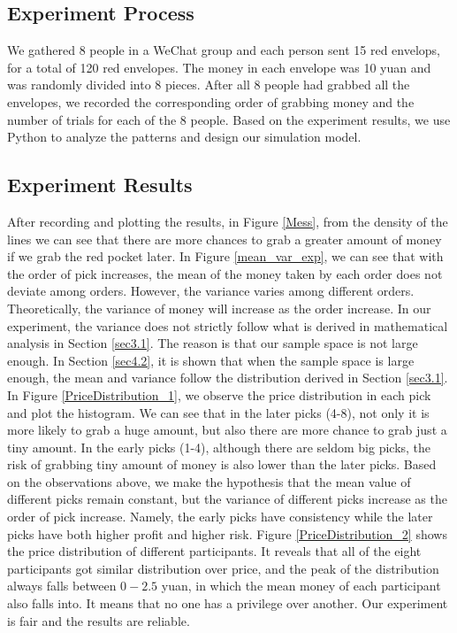 \documentclass{scrartcl}
\begin{document}
\subsection{Experiment Process}
\label{sec2.1}
We gathered 8 people in a WeChat group and each person sent 15 red envelops, for a total of 120 red envelopes. The money in each envelope was 10 yuan and was randomly divided into 8 pieces. After all 8 people had grabbed all the envelopes, we recorded the corresponding order of grabbing money and the number of trials for each of the 8 people. Based on the experiment results, we use Python to analyze the patterns and design our simulation model.

\subsection{Experiment Results}
\label{sec2.2}
After recording and plotting the results, in Figure \ref{Mess}, from the density of the lines we can see that there are more chances to grab a greater amount of money if we grab the red pocket later. In Figure \ref{mean_var_exp}, we can see that with the order of pick increases, the mean of the money taken by each order does not deviate among orders. However, the variance varies among different orders. Theoretically, the variance of money will increase as the order increase. In our experiment, the variance does not strictly follow what is derived in mathematical analysis in Section \ref{sec3.1}. The reason is that our sample space is not large enough. In Section \ref{sec4.2}, it is shown that when the sample space is large enough, the mean and variance follow the distribution derived in Section \ref{sec3.1}. In Figure \ref{PriceDistribution_1}, we observe the price distribution in each pick and plot the histogram. We can see that in the later picks (4-8), not only it is more likely to grab a huge amount, but also there are more chance to grab just a tiny amount. In the early picks (1-4), although there are seldom big picks, the risk of grabbing tiny amount of money is also lower than the later picks. Based on the observations above, we make the hypothesis that the mean value of different picks remain constant, but the variance of different picks increase as the order of pick increase. Namely, the early picks have consistency while the later picks have both higher profit and higher risk. Figure \ref{PriceDistribution_2} shows the price distribution of different participants. It reveals that all of the eight participants got similar distribution over price, and the peak of the distribution always falls between $0 - 2.5$ yuan, in which the mean money of each participant also falls into. It means that no one has a privilege over another. Our experiment is fair and the results are reliable. 
\end{document}
